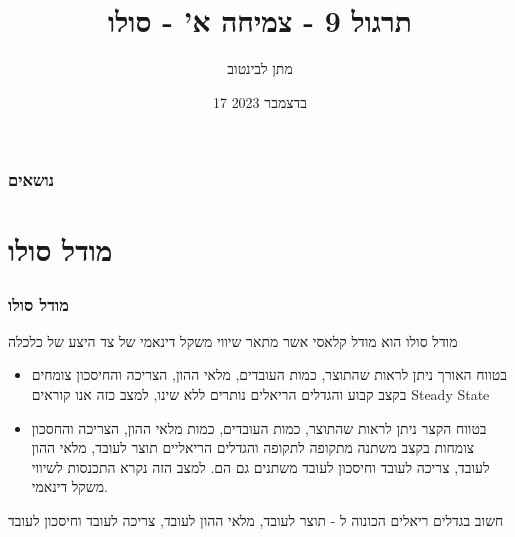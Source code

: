 \documentclass[usenames,dvipsnames]{beamer}
\title{תרגול 9 - צמיחה א' - סולו}
\author{\texthebrew{ מתן לבינטוב}}
\institute[{{ אב"ג}}]{{ אוניברסיטת בן גוריון בנגב}}
\date{17 בדצמבר 2023}
\begin{document}
\begin{RTL}
\begin{frame}
\titlepage
\end{frame}
\begin{frame}
    \frametitle{נושאים}
    \tableofcontents

    

\end{frame}

\section{מודל סולו}
\begin{frame}[allowframebreaks]
    \frametitle{מודל סולו}
    מודל סולו הוא מודל קלאסי אשר מתאר שיווי משקל דינאמי של צד היצע של כלכלה
    \begin{itemize}
        \item בטווח האורך  ניתן לראות שהתוצר, כמות העובדים, מלאי ההון, הצריכה והחיסכון צומחים בקצב קבוע והגדלים הריאלים נותרים ללא שינו, למצב כזה אנו קוראים Steady State
        \item בטווח הקצר ניתן לראות שהתוצר, כמות העובדים, כמות מלאי ההון, הצריכה והחסכון צומחות
        בקצב משתנה מתקופה לתקופה והגדלים הריאליים תוצר לעובד, מלאי ההון לעובד, צריכה
        לעובד וחיסכון לעובד  משתנים גם הם. למצב הזה נקרא התכנסות לשיווי משקל דינאמי.
    \end{itemize}
    \begin{alertblock}{חשוב}
        בגדלים ריאלים הכונוה ל - תוצר לעובד, מלאי ההון לעובד, צריכה לעובד
        וחיסכון לעובד
    \end{alertblock}

    \framebreak

    

\end{frame}
\end{RTL}
\end{document}
